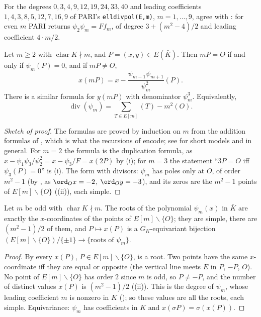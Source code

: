 For  the degrees $0,3,4,9,12,19,24,33,40$ and leading coefficients $1,4,3,8,5,12,7,16,9$ of PARI's \texttt{elldivpol(E,m)}, $m=1,\dots,9$, agree with
: for even $m$ PARI returns $\psi_2\psi_m=Ff_m$, of degree $3+(m^2-4)/2$ and leading coefficient $4\cdot m/2$.

\begin{theorem}[multiplication by $m$]\label{thm:ellcurves:multm}
Let $m\ge2$ with $\operatorname{char}K\nmid m$, and $P=(x,y)\in E(\bar K)$. Then $mP=O$ if and only if $\psi_m(P)=0$, and if $mP\ne O$,
\[
x(mP)=x-\frac{\psi_{m-1}\psi_{m+1}}{\psi_m^2}(P).
\]
There is a similar formula for $y(mP)$ with denominator $\psi_m^3$. Equivalently,
\[
\operatorname{div}(\psi_m)=\sum_{T\in E[m]}(T)-m^2(O).
\]
\end{theorem}

\begin{proof}[Sketch of proof]
The formulas are proved by induction on $m$ from the addition formulas of , which is what the recursions of
 encode; see \cite[Section 3.2]{WashingtonEC} for short models and \cite[Exercise 3.7]{SilvermanAEC} in general. For $m=2$ the
formula is the duplication formula, as $x-\psi_1\psi_3/\psi_2^2=x-\psi_3/F=x(2P)$ by (i); for $m=3$ the statement ``$3P=O$ iff
$\psi_3(P)=0$'' is (i). The form with divisors: $\psi_m$ has poles only at $O$, of order $m^2-1$ (by ,
as $\ord_Ox=-2$, $\ord_Oy=-3$), and its zeros are the $m^2-1$ points of $E[m]\smallsetminus\{O\}$ ((ii)), each simple.
\end{proof}

\begin{corollary}\label{cor:ellcurves:divpol-roots}
Let $m$ be odd with $\operatorname{char}K\nmid m$. The roots of the polynomial $\psi_m(x)$ in $\bar K$ are exactly the $x$-coordinates of the points of
$E[m]\smallsetminus\{O\}$; they are simple, there are $(m^2-1)/2$ of them, and $P\mapsto x(P)$ is a $G_K$-equivariant bijection
$(E[m]\smallsetminus\{O\})/\{\pm1\}\to\{\text{roots of }\psi_m\}$.
\end{corollary}

\begin{proof}
By  every $x(P)$, $P\in E[m]\smallsetminus\{O\}$, is a root. Two points have the same $x$-coordinate iff they are equal or opposite (the
vertical line meets $E$ in $P$, $-P$, $O$). No point of $E[m]\smallsetminus\{O\}$ has order $2$ since $m$ is odd, so $P\ne-P$, and the number of distinct values $x(P)$ is
$(m^2-1)/2$ ((ii)). This is the degree of $\psi_m$, whose leading coefficient $m$ is nonzero in $K$ ();
so these values are all the roots, each simple. Equivariance: $\psi_m$ has coefficients in $K$ and $x(\sigma P)=\sigma(x(P))$.
\end{proof}

